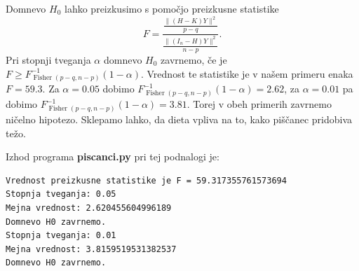 \documentclass[a4paper,12pt]{article}
\theoremstyle{definition}
\theoremstyle{plain}
\DeclareMathOperator*{\Fisher}{Fisher}
\begin{document}
\begin{enumerate}[a)]
    Domnevo $H_0$ lahko preizkusimo s pomočjo preizkusne statistike 
    $$F = \frac{\frac{\|(H - K)Y\|^2}{p - q}}{\frac{\|(I_n - H)Y\|^2}{n - p}}.$$
    Pri stopnji tveganja $\alpha$ domnevo $H_0$ zavrnemo, če je $F \ge F_{\Fisher(p-q, n-p)}^{-1}(1 - \alpha)$.
    Vrednost te statistike je v našem primeru enaka $F = 59.3$. Za $\alpha = 0.05$ dobimo $F_{\Fisher(p-q, n-p)}^{-1}(1 - \alpha) = 2.62$, za $\alpha = 0.01$ pa dobimo $F_{\Fisher(p-q, n-p)}^{-1}(1 - \alpha) = 3.81$. Torej v obeh primerih zavrnemo ničelno hipotezo. Sklepamo lahko, da dieta vpliva na to, kako piščanec pridobiva težo.

    Izhod programa \textbf{piscanci.py} pri tej podnalogi je:
    \begin{verbatim}
Vrednost preizkusne statistike je F = 59.317355761573694
Stopnja tveganja: 0.05
Mejna vrednost: 2.620455604996189 
Domnevo H0 zavrnemo.
Stopnja tveganja: 0.01
Mejna vrednost: 3.8159519531382537
Domnevo H0 zavrnemo.
    \end{verbatim}

\end{enumerate}
\end{document}
